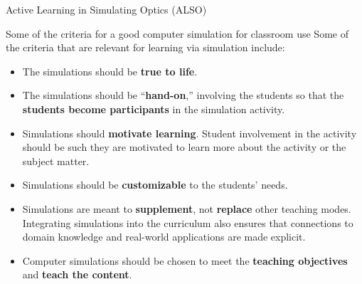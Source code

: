 \documentclass[9pt]{beamer}
\begin{document}
\begin{frame}{Active Learning in Simulating Optics (ALSO)}

\begin{block}{Some of the criteria for a good computer simulation for classroom use}
	Some of the criteria that are relevant for learning via simulation include:
	\begin{itemize}
		\item The simulations should be \textbf{true to life}.
		\item The simulations should be “\textbf{hand-on},” involving the students so that the \textbf{students become participants} in the
		simulation activity.
		\item Simulations should \textbf{motivate learning}. Student involvement in the activity should be such they are motivated to learn more about the activity or the subject matter.
		\item Simulations should be \textbf{customizable} to the students' needs.
		\item Simulations are meant to \textbf{supplement}, \alert{not} \textbf{replace} other teaching modes. Integrating simulations into the
		curriculum also ensures that connections to domain knowledge and real-world applications are made explicit.
		\item Computer simulations should be chosen to meet the \textbf{teaching objectives}
		and \textbf{teach the content}.
	\end{itemize}
\end{block}

\end{frame}
\end{document}
